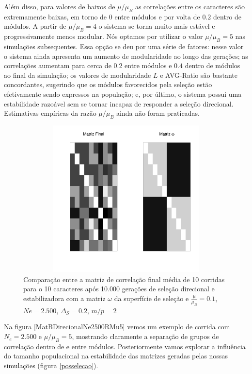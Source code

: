 Além disso, para valores de baixos de $\mu/\mu_B$ as correlações entre
os caracteres são extremamente baixas, em torno de $0$ entre módulos e
por volta de $0.2$ dentro de módulos.
A partir de $\mu/\mu_B=4$ o sistema se torna muito mais estável e
progressivamente menos modular. 
Nós optamos por utilizar o valor $\mu/\mu_B=5$ nas simulações
subsequentes. 
Essa opção se deu por uma série de fatores: nesse valor o sistema ainda
apresenta um aumento de modularidade ao longo das gerações; as
correlações aumentam para cerca de $0.2$ entre módulos e $0.4$ dentro de
módulos ao final da simulação; os valores de modularidade $L$ e
AVG-Ratio são bastante concordantes, sugerindo que os módulos
favorecidos pela seleção estão efetivamente sendo expressos na
população; e, por último, o sistema possui uma estabilidade razoável sem
se tornar incapaz de responder a seleção direcional. 
Estimativas empíricas da razão $\mu/\mu_B$ ainda não foram praticadas.



\begin{figure}[htbp]
    \centering
    \includegraphics[width=150mm, height=80mm]{figuras/RMu01Omega}
    \caption{Comparação entre a matriz de correlação final média de 10
        corridas para o 10 caracteres após 10.000 gerações de seleção direcional e
        estabilizadora com a matriz $\omega$ da superfície de seleção e
    $\frac{\mu}{\mu_B}=0.1$, $Ne=2.500$, $\Delta_S=0.2$, $m/p=2$}
    \label{RMu01}
\end{figure}


Na figura \ref{MatBDirecionalNe2500RMu5} vemos um exemplo de corrida com
$N_e = 2.500$ e $\mu/\mu_B=5$, mostrando claramente a separação de grupos
de correlação dentro de e entre módulos. 
Posteriormente vamos explorar a influência do tamanho populacional na
estabilidade das matrizes geradas pelas nossas simulações (figura
\ref{posselecao}). 


